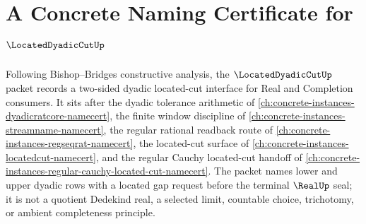 \chapter{A Concrete Naming Certificate for $\LocatedDyadicCutUp$}
\label{ch:concrete-instances-located-dyadic-cut-namecert}

Following Bishop--Bridges constructive analysis, the $\LocatedDyadicCutUp$ packet records a two-sided dyadic located-cut interface for Real and Completion consumers. It sits after the dyadic tolerance arithmetic of \autoref{ch:concrete-instances-dyadicratcore-namecert}, the finite window discipline of \autoref{ch:concrete-instances-streamname-namecert}, the regular rational readback route of \autoref{ch:concrete-instances-regseqrat-namecert}, the located-cut surface of \autoref{ch:concrete-instances-locatedcut-namecert}, and the regular Cauchy located-cut handoff of \autoref{ch:concrete-instances-regular-cauchy-located-cut-namecert}. The packet names lower and upper dyadic rows with a located gap request before the terminal $\RealUp$ seal; it is not a quotient Dedekind real, a selected limit, countable choice, trichotomy, or ambient completeness principle.

